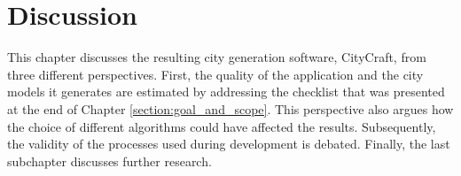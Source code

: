 \chapter{Discussion}

This chapter discusses the resulting city generation software, CityCraft, from three different perspectives.
First, the quality of the application and the city models it generates are estimated by addressing the checklist that was presented at the end of Chapter \ref{section:goal_and_scope}.
This perspective also argues how the choice of different algorithms could have affected the results.
Subsequently, the validity of the processes used during development is debated.
Finally, the last subchapter discusses further research.




